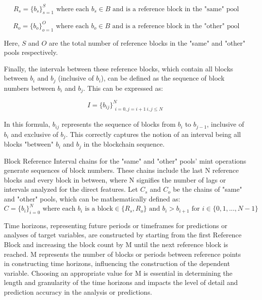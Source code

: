 \documentclass{article}
\begin{document}
\begin{equation}
R_{s} = \{b_{s}\}_{s=1}^{S} \text{ where each } b_{s} \in B \text{ and is a reference block in the "same" pool}
\end{equation}

\begin{equation}
R_{o} = \{b_{o}\}_{o=1}^{O} \text{ where each } b_{o} \in B \text{ and is a reference block in the "other" pool}
\end{equation}

Here, $S$ and $O$ are the total number of reference blocks in the "same" and "other" pools respectively.

Finally, the intervals between these reference blocks, which contain all blocks between $b_i$ and $b_j$ (inclusive of $b_i$), can be defined as the sequence of block numbers between $b_i$ and $b_j$. This can be expressed as:

\begin{equation}
I = \{b_{ij}\}_{\substack{i=0,j=i+1 \ i,j\leq N}}^N
\end{equation}

In this formula, $b_{ij}$ represents the sequence of blocks from $b_i$ to $b_{j-1}$, inclusive of $b_i$ and exclusive of $b_j$. This correctly captures the notion of an interval being all blocks "between" $b_i$ and $b_j$ in the blockchain sequence.

Block Reference Interval chains for the "same" and "other" pools' mint operations generate sequences of block numbers. These chains include the last N reference blocks and every block in between, where N signifies the number of lags or intervals analyzed for the direct features. Let $C_{s}$ and $C_{o}$ be the chains of "same" and "other" pools, which can be mathematically defined as:
\begin{equation}
C = \{b_{i}\}_{i=0}^{N} \text{ where each } b_{i} \text{ is a block} \in \{R_s, R_o\} \text{ and } b_{i} > b_{i+1} \text{ for } i \in \{0,1,...,N-1\}
\end{equation}

Time horizons, representing future periods or timeframes for predictions or analyses of target variables, are constructed by starting from the first Reference Block and increasing the block count by M until the next reference block is reached. M represents the number of blocks or periods between reference points in constructing time horizons, influencing the construction of the dependent variable. Choosing an appropriate value for M is essential in determining the length and granularity of the time horizons and impacts the level of detail and prediction accuracy in the analysis or predictions.
\end{document}
